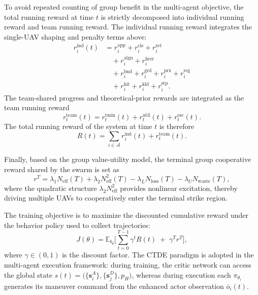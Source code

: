 \documentclass{cja}
\begin{document}
To avoid repeated counting of group benefit in the multi-agent objective, the total running reward at time $t$ is strictly decomposed into individual running reward and team running reward. The individual running reward integrates the single-UAV shaping and penalty terms above:
\begin{equation}
\begin{aligned}
r_i^{\mathrm{ind}}(t)
&=
{r_i^{\mathrm{app}}+r_i^{\mathrm{cls}}+r_i^{\mathrm{ret}}}\\
&\quad
+{r_i^{\mathrm{algn}}+r_i^{\mathrm{herr}}}\\
&\quad
+{r_i^{\mathrm{bnd}}+r_i^{\mathrm{grd}}+r_i^{\mathrm{prx}}+r_i^{\mathrm{reg}}}\\
&\quad
+r_i^{\mathrm{hit}}+r_i^{\mathrm{kld}}+r_i^{\mathrm{stp}}.
\end{aligned}
\label{eq:r-ind}
\end{equation}
The team-shared progress and theoretical-prior rewards are integrated as the team running reward
\begin{equation}
r_t^{\mathrm{team}}(t)
=
r_t^{\mathrm{tmin}}(t)
+
r_t^{\mathrm{util}}(t)
+
r_t^{\mathrm{esc}}(t).
\end{equation}
The total running reward of the system at time $t$ is therefore
\begin{equation}
R(t)=\sum_{i\in\mathcal{A}}r_i^{\mathrm{ind}}(t)+r_t^{\mathrm{team}}(t).
\label{eq:r-total}
\end{equation}

Finally, based on the group value-utility model, the terminal group cooperative reward shared by the swarm is set as
\begin{equation}
r^{T}=\lambda_1 N_{\mathrm{eff}}(T)+\lambda_2 N_{\mathrm{eff}}^{2}(T)
-\lambda_L N_{\mathrm{loss}}(T)-\lambda_U N_{\mathrm{waste}}(T),
\label{eq:r-term}
\end{equation}
where the quadratic structure $\lambda_2 N_{\mathrm{eff}}^{2}$ provides nonlinear excitation, thereby driving multiple UAVs to cooperatively enter the terminal strike region.

The training objective is to maximize the discounted cumulative reward under the behavior policy used to collect trajectories:
\begin{equation}
J(\theta)=\mathbb{E}_{b_\theta}\Biggl[\sum_{t=0}^{T-1}\gamma^{t} R(t)\;+\;\gamma^{T} r^{T}\Biggr],
\label{eq:rl-objective}
\end{equation}
where $\gamma\in(0,1)$ is the discount factor. The CTDE paradigm is adopted in the multi-agent execution framework: during training, the critic network can access the global state $s(t)=\bigl(\{\mathbf s_i^A\},\{\mathbf s_j^D\},p_H\bigr)$, whereas during execution each $\pi_{\theta_i}$ generates its maneuver command from the enhanced actor observation $\bar o_i(t)$.
\end{document}
